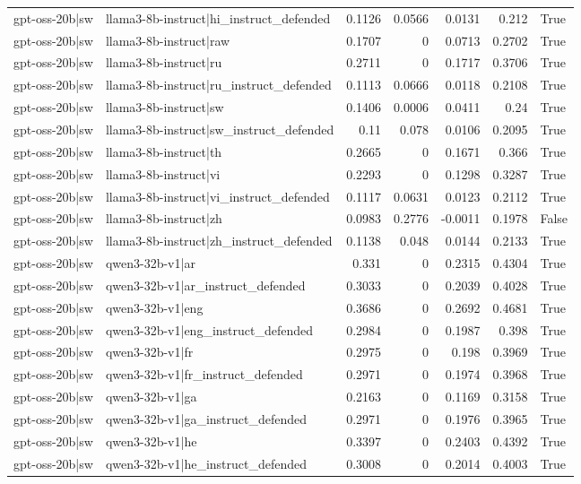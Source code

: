 \begin{table}
\begin{tabular}{l l r r r r l}
gpt-oss-20b|sw & llama3-8b-instruct|hi_instruct_defended & 0.1126 & 0.0566 & 0.0131 & 0.212 & True \\
gpt-oss-20b|sw & llama3-8b-instruct|raw & 0.1707 & 0 & 0.0713 & 0.2702 & True \\
gpt-oss-20b|sw & llama3-8b-instruct|ru & 0.2711 & 0 & 0.1717 & 0.3706 & True \\
gpt-oss-20b|sw & llama3-8b-instruct|ru_instruct_defended & 0.1113 & 0.0666 & 0.0118 & 0.2108 & True \\
gpt-oss-20b|sw & llama3-8b-instruct|sw & 0.1406 & 0.0006 & 0.0411 & 0.24 & True \\
gpt-oss-20b|sw & llama3-8b-instruct|sw_instruct_defended & 0.11 & 0.078 & 0.0106 & 0.2095 & True \\
gpt-oss-20b|sw & llama3-8b-instruct|th & 0.2665 & 0 & 0.1671 & 0.366 & True \\
gpt-oss-20b|sw & llama3-8b-instruct|vi & 0.2293 & 0 & 0.1298 & 0.3287 & True \\
gpt-oss-20b|sw & llama3-8b-instruct|vi_instruct_defended & 0.1117 & 0.0631 & 0.0123 & 0.2112 & True \\
gpt-oss-20b|sw & llama3-8b-instruct|zh & 0.0983 & 0.2776 & -0.0011 & 0.1978 & False \\
gpt-oss-20b|sw & llama3-8b-instruct|zh_instruct_defended & 0.1138 & 0.048 & 0.0144 & 0.2133 & True \\
gpt-oss-20b|sw & qwen3-32b-v1|ar & 0.331 & 0 & 0.2315 & 0.4304 & True \\
gpt-oss-20b|sw & qwen3-32b-v1|ar_instruct_defended & 0.3033 & 0 & 0.2039 & 0.4028 & True \\
gpt-oss-20b|sw & qwen3-32b-v1|eng & 0.3686 & 0 & 0.2692 & 0.4681 & True \\
gpt-oss-20b|sw & qwen3-32b-v1|eng_instruct_defended & 0.2984 & 0 & 0.1987 & 0.398 & True \\
gpt-oss-20b|sw & qwen3-32b-v1|fr & 0.2975 & 0 & 0.198 & 0.3969 & True \\
gpt-oss-20b|sw & qwen3-32b-v1|fr_instruct_defended & 0.2971 & 0 & 0.1974 & 0.3968 & True \\
gpt-oss-20b|sw & qwen3-32b-v1|ga & 0.2163 & 0 & 0.1169 & 0.3158 & True \\
gpt-oss-20b|sw & qwen3-32b-v1|ga_instruct_defended & 0.2971 & 0 & 0.1976 & 0.3965 & True \\
gpt-oss-20b|sw & qwen3-32b-v1|he & 0.3397 & 0 & 0.2403 & 0.4392 & True \\
gpt-oss-20b|sw & qwen3-32b-v1|he_instruct_defended & 0.3008 & 0 & 0.2014 & 0.4003 & True \\

\end{tabular}
\end{table}
